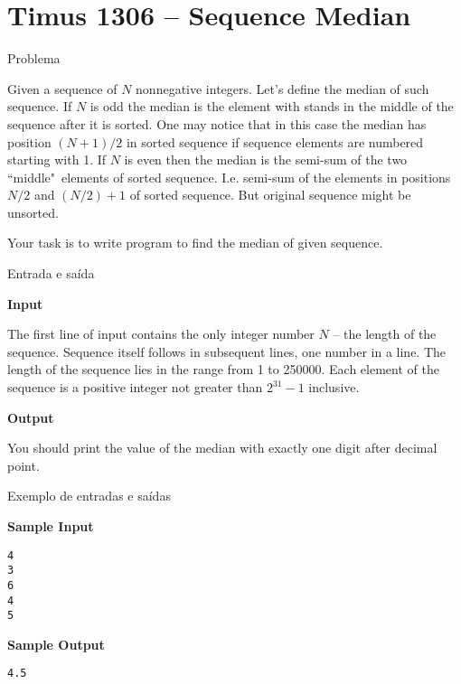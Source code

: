 \section{Timus 1306 -- Sequence Median}

\begin{frame}[fragile]{Problema}

Given a sequence of $N$ nonnegative integers. Let's define the median of such sequence. 
If $N$ is odd the median is the element with stands in the middle of the sequence after it is 
sorted. One may notice that in this case the median has position $(N+1)/2$ in sorted sequence if 
sequence elements are numbered starting with 1. If $N$ is even then the median is the semi-sum of 
the two ``middle"\ elements of sorted sequence. I.e. semi-sum of the elements in positions 
$N/2$ and $(N/2)+1$ of sorted sequence. But original sequence might be unsorted.

Your task is to write program to find the median of given sequence.

\end{frame}

\begin{frame}[fragile]{Entrada e saída}

\textbf{Input}

The first line of input contains the only integer number $N$ -- the length of the sequence. 
Sequence itself follows in subsequent lines, one number in a line. The length of the sequence lies 
in the range from 1 to 250000. Each element of the sequence is a positive integer not greater than 
$2^{31}-1$ inclusive.

\textbf{Output}

You should print the value of the median with exactly one digit after decimal point.

\end{frame}

\begin{frame}[fragile]{Exemplo de entradas e saídas}

\begin{minipage}[t]{0.5\textwidth}
\textbf{Sample Input}
\begin{verbatim}
4
3
6
4
5
\end{verbatim}
\end{minipage}
\begin{minipage}[t]{0.45\textwidth}
\textbf{Sample Output}
\begin{verbatim}
4.5
\end{verbatim}
\end{minipage}
\end{frame}

